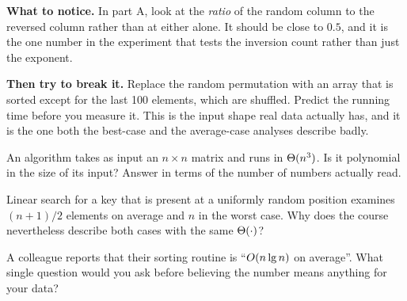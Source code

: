 \begin{lab}
\textbf{What to notice.} In part A, look at the \emph{ratio} of the random
column to the reversed column rather than at either alone. It should be close to
$0.5$, and it is the one number in the experiment that tests the inversion
count rather than just the exponent.

\smallskip
\textbf{Then try to break it.} Replace the random permutation with an array
that is sorted except for the last 100 elements, which are shuffled. Predict
the running time before you measure it. This is the input shape real data
actually has, and it is the one both the best-case and the average-case
analyses describe badly.
\end{lab}

\begin{checkpoint}
\begin{tightnum}
  \item An algorithm takes as input an $n \times n$ matrix and runs in
        $\Theta(n^{3})$. Is it polynomial in the size of its input? Answer in
        terms of the number of numbers actually read.
  \item Linear search for a key that is present at a uniformly random position
        examines $(n+1)/2$ elements on average and $n$ in the worst case. Why
        does the course nevertheless describe both cases with the same
        $\Theta(\cdot)$?
  \item A colleague reports that their sorting routine is ``$O(n \operatorname{lg} n)$
        on average''. What single question would you ask before believing the
        number means anything for your data?
\end{tightnum}
\end{checkpoint}


